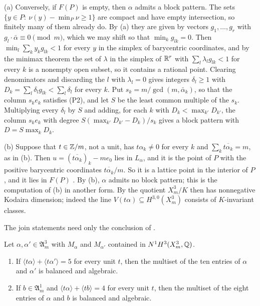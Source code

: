 \begin{remark}\label{rem:uniruled}
(a) Conversely, if $F(P)$ is empty, then $\alpha$ admits a block pattern.
The sets $\{y\in P:\ \nu(y)-\min_{P}\nu\ge1\}$ are compact and have empty
intersection, so finitely many of them already do. By (a)
they are given by vectors $g_{1},\dots,g_{r}$ with $g_{l}\cdot\bar\alpha
\equiv0\pmod m$, which we may shift so that $\min_{k}g_{lk}=0$. Then
$\min_{l}\sum_{k}y_{k}g_{lk}<1$ for every $y$ in the simplex of barycentric
coordinates, and by the minimax theorem the set of $\lambda$ in the simplex
of $\mathbb{R}^{r}$ with $\sum_{l}\lambda_{l}g_{lk}<1$ for every $k$ is a nonempty
open subset, so it contains a rational point. Clearing denominators and
discarding the $l$ with $\lambda_{l}=0$ gives integers $\delta_{l}\ge1$ with
$D_{k}=\sum_{l}\delta_{l}g_{lk}<\sum_{l}\delta_{l}$ for every $k$. Put
$s_{k}=m/\gcd(m,\bar\alpha_{k})$, so that the column $s_{k}e_{k}$ satisfies
(P2), and let $S$ be the least common multiple of the $s_{k}$. Multiplying
every $\delta_{l}$ by $S$ and adding, for each $k$ with $D_{k}<\max_{k'}
D_{k'}$, the column $s_{k}e_{k}$ with degree $S(\max_{k'}D_{k'}-D_{k})/s_{k}$
gives a block pattern with $D=S\max_{k}D_{k}$.

(b) Suppose that $t\in\mathbb{Z}/m$, not a unit, has $t\alpha_{k}\ne0$ for every
$k$ and $\sum_{k}\overline{t\alpha_{k}}=m$, as in (b). Then
$u=(\overline{t\alpha_{k}})_{k}-me_{0}$ lies in $L_{\alpha}$, and it is the
point of $P$ with the positive barycentric coordinates
$\overline{t\alpha_{k}}/m$. So it is a lattice point in the interior of $P$,
and it lies in $F(P)$ \cite[Remark~1.4]{Bat24}. By (b),
$\alpha$ admits no block pattern; this is the computation of
(b) in another form. By \cite[Corollary~5.6]{Bat24} the
quotient $X^{3}_{m}/K$ then has nonnegative Kodaira dimension; indeed the
line $V(t\alpha)\subseteq H^{3,0}(X^{3}_{m})$ consists of $K$-invariant
classes.
\end{remark}

The join statements need only the conclusion of .

\begin{proposition}\label{prop:joindivisor}
Let $\alpha,\alpha'\in\mathfrak A^{3}_{m}$ with $M_{\alpha}$ and
$M_{\alpha'}$ contained in $N^{1}H^{3}(X^{3}_{m},\mathbb{Q})$.
\begin{enumerate}[label=\textup{(\alph*)}]
\item If $\langle t\alpha\rangle+\langle t\alpha'\rangle=5$ for every unit
$t$, then the multiset of the ten entries of $\alpha$ and $\alpha'$ is
balanced and algebraic.
\item If $b\in\mathfrak A^{1}_{m}$ and $\langle t\alpha\rangle+\langle
tb\rangle=4$ for every unit $t$, then the multiset of the eight entries of
$\alpha$ and $b$ is balanced and algebraic.
\end{enumerate}
\end{proposition}


